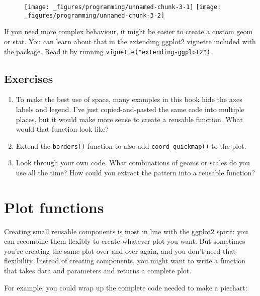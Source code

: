 \begin{figure}[H]
  \centering
  \texttt{[image: \_figures/programming/unnamed-chunk-3-1]}%
  \texttt{[image: \_figures/programming/unnamed-chunk-3-2]}
\end{figure}

If you need more complex behaviour, it might be easier to create a
custom geom or stat. You can learn about that in the extending ggplot2
vignette included with the package. Read it by running
\texttt{vignette("extending-ggplot2")}.

\subsection{Exercises}

\begin{enumerate}
\def\labelenumi{\arabic{enumi}.}
\item
  To make the best use of space, many examples in this book hide the
  axes labels and legend. I've just copied-and-pasted the same code into
  multiple places, but it would make more sense to create a reusable
  function. What would that function look like?
\item
  Extend the \texttt{borders()} function to also add
  \texttt{coord\_quickmap()} to the plot.
\item
  Look through your own code. What combinations of geoms or scales do
  you use all the time? How could you extract the pattern into a
  reusable function?
\end{enumerate}

\section{Plot functions}\label{sec:functions}

Creating small reusable components is most in line with the ggplot2
spirit: you can recombine them flexibly to create whatever plot you
want. But sometimes you're creating the same plot over and over again,
and you don't need that flexibility. Instead of creating components, you
might want to write a function that takes data and parameters and
returns a complete plot. 

For example, you could wrap up the complete code needed to make a
piechart:

